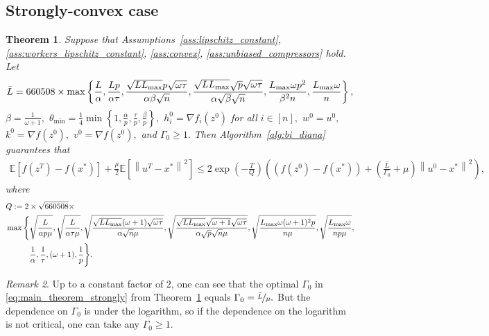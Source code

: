 \documentclass{article} %
\newcommand{\norm}[1]{\left\| #1 \right\|}
\newcommand{\Exp}[1]{{\mathbb{E}}\left[#1\right]}
\theoremstyle{plain}
\newtheorem{theorem}{Theorem}[section]
\theoremstyle{definition}
\theoremstyle{remark}
\newtheorem{remark}[theorem]{Remark}
\newcommand{\eqdef}{:=}
\begin{document}
\subsection{Strongly-convex case}
\begin{theorem}
  \label{theorem:main_theorem_strongly}
  Suppose that Assumptions~\ref{ass:lipschitz_constant}, \ref{ass:workers_lipschitz_constant}, \ref{ass:convex}, \ref{ass:unbiased_compressors} hold. Let
\begin{align}
  \bar{L} = 660508 \times \max\left\{\frac{L}{\alpha}, \frac{L p}{\alpha \tau}, \frac{\sqrt{L L_{\max}} p \sqrt{\omega \tau}}{\alpha \beta \sqrt{n}}, \frac{\sqrt{L L_{\max}} \sqrt{p} \sqrt{\omega \tau}}{\alpha \sqrt{\beta} \sqrt{n}}, \frac{L_{\max} \omega p^2}{\beta^2 n}, \frac{L_{\max} \omega}{n}\right\},
\end{align}
$\beta = \frac{1}{\omega + 1},$ $\theta_{\min} = \frac{1}{4}\min\left\{1, \frac{\alpha}{p}, \frac{\tau}{p}, \frac{\beta}{p}\right\},$ $h_i^0 = \nabla f_i(z^{0})$ for all $i \in [n],$ $w^0 = u^0,$ $k^{0} = \nabla f(z^0),$ $v^{0} = \nabla f(z^0),$ and $\Gamma_0 \geq 1.$
Then Algorithm~\ref{alg:bi_diana} guarantees that
\begin{equation}
\begin{aligned}
  \label{eq:main_theorem_strongly}
  \Exp{f(z^{T}) - f(x^*)} + \frac{\mu}{2} \Exp{\norm{u^{T} - x^*}^2} \leq 2\exp\left(-\frac{T}{Q}\right)\left(\left(f(z^{0}) - f(x^*)\right) + \left(\frac{\bar{L}}{\Gamma_{0}} + \mu\right) \norm{u^0 - x^*}^2\right),
\end{aligned}
\end{equation}
where
\begin{align*}
  &Q \eqdef 2 \times \sqrt{\liptconstraintconst} \times \\
  &\max\Bigg\{\sqrt{\frac{L}{\alpha p \mu}},\sqrt{\frac{L}{\alpha \tau \mu}},\sqrt{\frac{\sqrt{L L_{\max}} (\omega + 1) \sqrt{\omega \tau}}{\alpha \sqrt{n} \mu}},\sqrt{\frac{\sqrt{L L_{\max}} \sqrt{\omega + 1} \sqrt{\omega \tau}}{\alpha \sqrt{p} \sqrt{n} \mu}},\sqrt{\frac{L_{\max} \omega (\omega + 1)^2 p}{n \mu}}, \sqrt{\frac{L_{\max} \omega}{n p \mu}}, \\
  & \qquad \quad \frac{1}{\alpha}, \frac{1}{\tau}, (\omega + 1), \frac{1}{p}\Bigg\}.
\end{align*}
\end{theorem}

\begin{remark}
  Up to a constant factor of $2$, one can see that the optimal $\Gamma_0$ in \eqref{eq:main_theorem_strongly} from Theorem~\ref{theorem:main_theorem_strongly} equals $\Gamma_0 = \nicefrac{\bar{L}}{\mu}.$ But the dependence on $\Gamma_0$ is under the logarithm, so if the dependence on the logarithm is not critical, one can take any $\Gamma_0 \geq 1.$
\end{remark}
\end{document}
